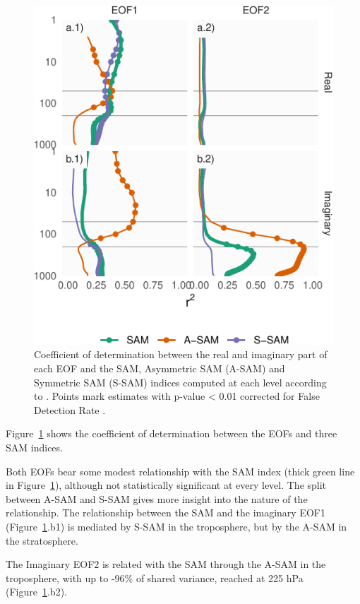 \documentclass[smallextended]{svjour3}       %
\begin{document}
\begin{figure}
\centering
\includegraphics{../figures/sam-eof-vertical-1.pdf}
\caption{\label{fig:sam-eof-vertical}Coefficient of determination between the real and imaginary part of each EOF and the SAM, Asymmetric SAM (A-SAM) and Symmetric SAM (S-SAM) indices computed at each level according to \citet{campitelli2021}. Points mark estimates with p-value \textless{} 0.01 corrected for False Detection Rate \citep{benjamini1995}.}
\end{figure}

Figure~\ref{fig:sam-eof-vertical} shows the coefficient of determination between the EOFs and three SAM indices.

Both EOFs bear some modest relationship with the SAM index (thick green line in Figure~\ref{fig:sam-eof-vertical}), although not statistically significant at every level. The split between A-SAM and S-SAM gives more insight into the nature of the relationship. The relationship between the SAM and the imaginary EOF1 (Figure~\ref{fig:sam-eof-vertical}.b1) is mediated by S-SAM in the troposphere, but by the A-SAM in the stratosphere.

The Imaginary EOF2 is related with the SAM through the A-SAM in the troposphere, with up to -96\% of shared variance, reached at 225 hPa (Figure~\ref{fig:sam-eof-vertical}.b2).
\end{document}
